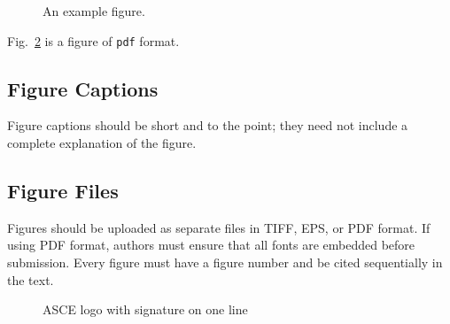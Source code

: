 \documentclass[NewProceedings, InsideFigs,LineNumbers]{asce-quarto}
\begin{document}
\begin{figure}


\caption{\label{fig-fill-between}An example figure.}

\end{figure}%

Fig.~\ref{fig-asce-logo} is a figure of \texttt{pdf} format.

\subsection{Figure Captions}\label{figure-captions}

Figure captions should be short and to the point; they need not include
a complete explanation of the figure.

\subsection{Figure Files}\label{figure-files}

Figures should be uploaded as separate files in TIFF, EPS, or PDF
format. If using PDF format, authors must ensure that all fonts are
embedded before submission. Every figure must have a figure number and
be cited sequentially in the text.

\begin{figure}


\caption{\label{fig-asce-logo}ASCE logo with signature on one line}

\end{figure}%
\end{document}
